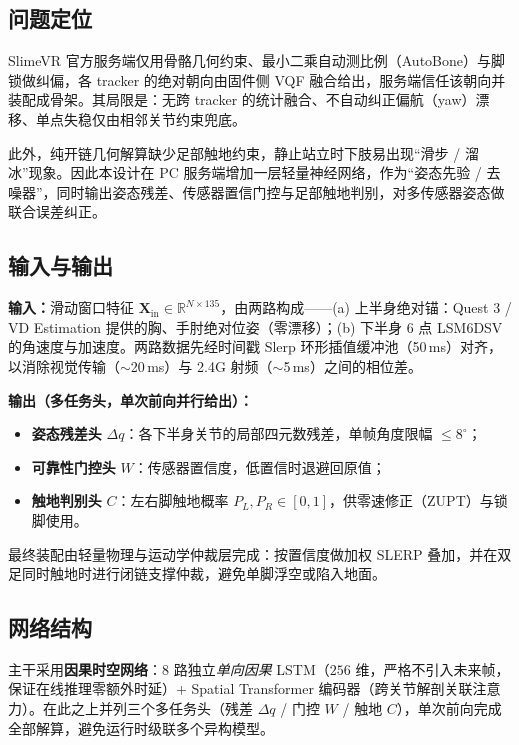 \documentclass[scheme=plain,UTF8,11pt,a4paper]{ctexart}
\begin{document}
\subsection{问题定位}

SlimeVR 官方服务端仅用骨骼几何约束、最小二乘自动测比例（AutoBone）与脚锁做纠偏，各 tracker 的绝对朝向由固件侧 VQF 融合给出，服务端信任该朝向并装配成骨架。其局限是：无跨 tracker 的统计融合、不自动纠正偏航（yaw）漂移、单点失稳仅由相邻关节约束兜底。

此外，纯开链几何解算缺少足部触地约束，静止站立时下肢易出现“滑步 / 溜冰”现象。因此本设计在 PC 服务端增加一层轻量神经网络，作为“姿态先验 / 去噪器”，同时输出姿态残差、传感器置信门控与足部触地判别，对多传感器姿态做联合误差纠正。

\subsection{输入与输出}

\textbf{输入：}滑动窗口特征 $\mathbf{X}_{\text{in}} \in \mathbb{R}^{N \times 135}$，由两路构成——(a) 上半身绝对锚：Quest 3 / VD Estimation 提供的胸、手肘绝对位姿（零漂移）；(b) 下半身 6 点 LSM6DSV 的角速度与加速度。两路数据先经时间戳 Slerp 环形插值缓冲池（50\,ms）对齐，以消除视觉传输（$\sim$20\,ms）与 2.4G 射频（$\sim$5\,ms）之间的相位差。

\textbf{输出（多任务头，单次前向并行给出）：}
\begin{itemize}
    \item \textbf{姿态残差头} $\Delta q$：各下半身关节的局部四元数残差，单帧角度限幅 $\le 8^{\circ}$；
    \item \textbf{可靠性门控头} $W$：传感器置信度，低置信时退避回原值；
    \item \textbf{触地判别头} $C$：左右脚触地概率 $P_L, P_R \in [0,1]$，供零速修正（ZUPT）与锁脚使用。
\end{itemize}

最终装配由轻量物理与运动学仲裁层完成：按置信度做加权 SLERP 叠加，并在双足同时触地时进行闭链支撑仲裁，避免单脚浮空或陷入地面。

\subsection{网络结构}

主干采用\textbf{因果时空网络}：8 路独立\emph{单向因果} LSTM（$256$ 维，严格不引入未来帧，保证在线推理零额外时延）+ Spatial Transformer 编码器（跨关节解剖关联注意力）。在此之上并列三个多任务头（残差 $\Delta q$ / 门控 $W$ / 触地 $C$），单次前向完成全部解算，避免运行时级联多个异构模型。
\end{document}

